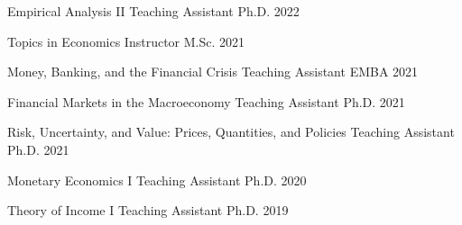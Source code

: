 
\begin{cvhonors}

  \cvhonor
  {Empirical Analysis II} %
  {Teaching Assistant} %
  {Ph.D.} %
  {2022} %

  \cvhonor
  {Topics in Economics} %
  {Instructor} %
  {M.Sc.} %
  {2021} %

  \cvhonor
  {Money, Banking, and the Financial Crisis} %
  {Teaching Assistant} %
  {EMBA} %
  {2021} %

  \cvhonor
  {Financial Markets in the Macroeconomy} %
  {Teaching Assistant} %
  {Ph.D.} %
  {2021} %

  \cvhonor
  {Risk, Uncertainty, and Value: Prices, Quantities, and Policies} %
  {Teaching Assistant} %
  {Ph.D.} %
  {2021} %

  \cvhonor
  {Monetary Economics I} %
  {Teaching Assistant} %
  {Ph.D.} %
  {2020} %

  \cvhonor
  {Theory of Income I} %
  {Teaching Assistant} %
  {Ph.D.} %
  {2019} %

\end{cvhonors}

